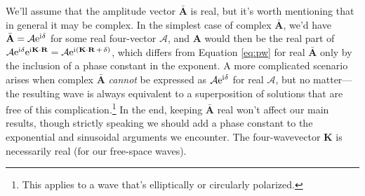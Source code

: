 \documentclass[12pt]{article}
\renewcommand{\vv}[1]{\mathbf{#1}}
\begin{document}
We'll assume that the amplitude vector $\bar{\vv A}$ is real, but it's worth mentioning that in general it may be complex. In the simplest case of complex $\bar{\vv A}$, we'd have $\bar{\vv A} = \mathcal{A} \mathrm{e}^{\mathrm{i} \mkern.5mu \delta}$ for some real four-vector $\mathcal{A}$, and $\vv A$ would then be the real part of ${\mathcal{A} \mathrm{e}^{\mathrm{i} \mkern.5mu \delta} \mathrm{e}^{\mathrm{i} \mkern.5mu \vv K \cdot \vv R} = \mathcal{A} \mathrm{e}^{\mathrm{i} \mkern.5mu ( \vv K \cdot \vv R \, + \, \delta )}}$, which differs from Equation \ref{eq:pw} for real $\bar{\vv A}$ only by the inclusion of a phase constant in the exponent. A more complicated scenario arises when complex $\bar{\vv A}$ \emph{cannot} be expressed as $\mathcal{A} \mathrm{e}^{\mathrm{i} \mkern.5mu \delta}$ for real $\mathcal{A}$, but no matter---the resulting wave is always equivalent to a superposition of solutions that are free of this complication.\footnote{This applies to a wave that's elliptically or circularly polarized.} In the end, keeping $\bar{\vv A}$ real won't affect our main results, though strictly speaking we should add a phase constant to the exponential and sinusoidal arguments we encounter. The four-wavevector $\vv K$ is necessarily real (for our free-space waves).
\end{document}
